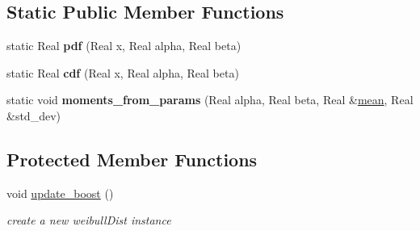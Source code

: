 \subsection*{Static Public Member Functions}
\begin{DoxyCompactItemize}
\item 
static Real {\bfseries pdf} (Real x, Real alpha, Real beta)\label{classPecos_1_1WeibullRandomVariable_a739d94cef9ee188f00056e229ca3fd95}

\item 
static Real {\bfseries cdf} (Real x, Real alpha, Real beta)\label{classPecos_1_1WeibullRandomVariable_a6ccc276bca2bfdfd6f320c65a6c8aaf7}

\item 
static void {\bfseries moments\+\_\+from\+\_\+params} (Real alpha, Real beta, Real \&\hyperlink{classPecos_1_1WeibullRandomVariable_a962ffe5a3593be370d5c883365c060f4}{mean}, Real \&std\+\_\+dev)\label{classPecos_1_1WeibullRandomVariable_af6459b831a8e62a41f7eab34d06edad8}

\end{DoxyCompactItemize}
\subsection*{Protected Member Functions}
\begin{DoxyCompactItemize}
\item 
void \hyperlink{classPecos_1_1WeibullRandomVariable_aaa6750cbee2245416a6eeeac58d4405a}{update\+\_\+boost} ()\label{classPecos_1_1WeibullRandomVariable_aaa6750cbee2245416a6eeeac58d4405a}

\begin{DoxyCompactList}\small\item\em create a new weibull\+Dist instance \end{DoxyCompactList}\end{DoxyCompactItemize}
